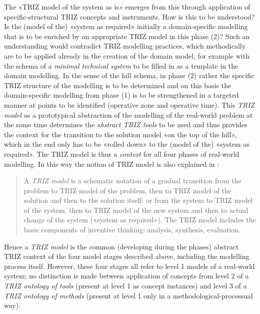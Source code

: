 \documentclass[11pt,a4paper]{article}
\begin{document}
The «TRIZ model of the system as is» emerges from this through application of
specific-structural TRIZ concepts and instruments. How is this to be
understood? Is the (model of the) «system as required» initially a
domain-specific modelling that is to be enriched by an appropriate TRIZ model
in this phase (2)? Such an understanding would contradict TRIZ modelling
practices, which methodically are to be applied already in the creation of the
domain model, for example with the schema of a \emph{minimal technical system}
to be filled in as a template in the domain modelling. In the sense of the
hill schema, in phase (2) rather the specific TRIZ structure of the modelling
is to be determined and on this basis the domain-specific modelling from phase
(1) is to be strengthened in a targeted manner at points to be identified
(operative zone and operative time). This \emph{TRIZ model} as a prototypical
abstraction of the modelling of the real-world problem at the same time
determines the \emph{abstract TRIZ tools} to be used and thus provides the
context for the transition to the solution model «on the top of the hill»,
which in the end only has to be «rolled down» to the (model of the) «system as
required». The TRIZ model is thus a \emph{context} for all four phases of
real-world modelling.  In this way the notion of TRIZ model is also explained
in \cite{TOP-Glossary}:
\begin{quote}
  A \emph{TRIZ model} is a schematic notation of a gradual transition from the
  problem to TRIZ model of the problem, then to TRIZ model of the solution and
  then to the solution itself; or from the system to TRIZ model of the system,
  then to TRIZ model of the new system and then to actual change of the system
  («system as required»). The TRIZ model includes the basic components of
  inventive thinking: analysis, synthesis, evaluation.
\end{quote}
Hence a \emph{TRIZ model} is the common (developing during the phases)
abstract TRIZ context of the four model stages described above, including the
modelling process itself.  However, these four stages all refer to level 1
models of a real-world system; no distinction is made between application of
concepts from level 2 of a \emph{TRIZ ontology of tools} (present at level 1
as concept instances) and level 3 of a \emph{TRIZ ontology of methods}
(present at level 1 only in a methodological-processual way).
\end{document}
